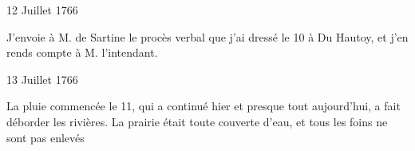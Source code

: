                      \begin{diary}{12 Juillet 1766}{}
                        
                         J'envoie à M. de Sartine le procès
                           verbal que j'ai
                           dressé le 10 à Du Hautoy, et j'en rends compte
                           à M. l'intendant. \bigskip
        
        
                     \end{diary}

                     \begin{diary}{13 Juillet 1766}{}
                        
                         La pluie commencée le 11, qui a continué
                           hier et presque tout aujourd'hui, a fait déborder
                           les rivières. La prairie était toute couverte
                           d'eau, et tous les foins ne sont pas enlevés \bigskip
        
        
                     \end{diary}

